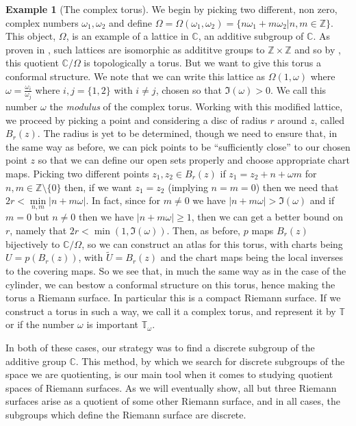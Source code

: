 \documentclass[11pt]{report}
\theoremstyle{definition}
\newtheorem*{example*}{Example}
\begin{document}
\begin{example*}[The complex torus]
We begin by picking two different, non zero, complex numbers $\omega_1, \omega_2$ and define $\Omega = \Omega(\omega_1,\omega_2) = \{n\omega_1 + m\omega_2 \vert n,m \in \mathbb{Z} \}$. This object, $\Omega$, is an example of a lattice in $\mathbb{C}$, an additive subgroup of $\mathbb{C}$. As proven in \cite[p.58]{comfun}, such lattices are isomorphic as addititve groups to $\mathbb{Z} \times \mathbb{Z}$ and so by \cite[Example 1.43]{Hatchers}, this quotient $\mathbb{C}/\Omega$ is topologically a torus. But we want to give this torus a conformal structure. We note that we can write this lattice as $\Omega(1,\omega)$ where $\omega=\frac{\omega_i}{\omega_j}$ where $i,j = \{1, 2\}$ with $i \neq j$, chosen so that $\Im(\omega) > 0$. We call this number $\omega$ the \emph{modulus} of the complex torus. Working with this modified lattice, we proceed by picking a point and considering a disc of radius $r$ around $z$, called $B_r(z)$. The radius is yet to be determined, though we need to ensure that, in the same way as before, we can pick points to be ``sufficiently close'' to our chosen point $z$ so that we can define our open sets properly and choose appropriate chart maps. Picking two different points $z_1,z_2 \in B_r(z)$ if $z_1 = z_2 + n + \omega m$ for $n,m \in \mathbb{Z}\setminus \{0\}$ then, if we want $z_1=z_2$ (implying $n=m=0$) then we need that $2r < \min\limits_{n,m}|n + m\omega|$. In fact, since for $m \neq 0$ we have $|n+m\omega| > \Im(\omega)$ and if $m=0$ but $n\neq 0$ then we have $|n + m\omega| \geq 1$, then we can get a better bound on $r$, namely that $2r < \min(1, \Im(\omega))$. Then, as before, $p$ maps $B_r(z)$ bijectively to $\mathbb{C}/\Omega$, so we can construct an atlas for this torus, with charts being $U = p(B_r(z))$, with $\tilde{U} = B_r(z)$ and the chart maps being the local inverses to the covering maps. So we see that, in much the same way as in the case of the cylinder, we can bestow a conformal structure on this torus, hence making the torus a Riemann surface. In particular this is a compact Riemann surface. If we construct a torus in such a way, we call it a complex torus, and represent it by $\mathbb{T}$ or if the number $\omega$ is important $\mathbb{T}_{\omega}$.
\end{example*}

In both of these cases, our strategy was to find a discrete subgroup of the additive group $\mathbb{C}$. This method, by which we search for discrete subgroups of the space we are quotienting, is our main tool when it comes to studying quotient spaces of Riemann surfaces. As we will eventually show, all but three Riemann surfaces arise as a quotient of some other Riemann surface, and in all cases, the subgroups which define the Riemann surface are discrete. 
\end{document}

